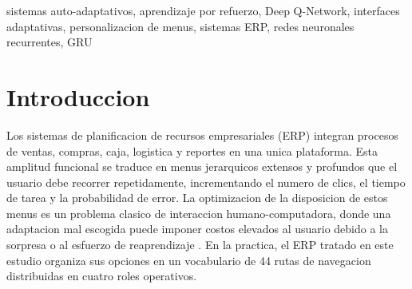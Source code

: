 \documentclass[conference]{IEEEtran}
\begin{document}
\begin{abstract}
Los sistemas ERP concentran gran parte de sus funciones en menus jerarquicos profundos, lo que incrementa el costo de navegacion del usuario y su carga cognitiva. Este trabajo presenta un enfoque auto-adaptativo que personaliza los menus de un ERP de gestion de articulos combinando un modelo neuronal secuencial de prediccion de la siguiente ruta con un agente de aprendizaje por refuerzo profundo del tipo Deep Q-Network (DQN) que reestructura el orden de los items. A partir de un corpus real de 87465 eventos de interaccion agrupados en 1206 sesiones de ocho usuarios y cuatro roles, se compararon cuatro arquitecturas predictivas (LSTM, GRU, Transformer y CNN 1D). La red GRU obtuvo la mejor exactitud sobre el vocabulario completo de 44 rutas (Top-1 de 0.3838 y Top-3 de 0.7294) con la convergencia mas rapida, por lo que fue seleccionada como generadora del puntaje de relevancia que alimenta al agente DQN. La probabilidad predictiva de la GRU se integro con la senal de recompensa del DQN mediante un puntaje compuesto ponderado. En una validacion PRE/POST, el numero de clics (M1) se redujo un 19.09\% (p menor que 0.001; d de Cohen igual a 0.646) y la tasa de error (M3) un 28.94\% (p menor que 0.001; d igual a 0.713), ambos con efecto medio y estadisticamente significativos; el tiempo de tarea (M2) disminuyo un 28.95\% pero sin significancia estadistica (p igual a 1.0; d igual a 0.284). Los resultados sugieren que la integracion de prediccion secuencial y reestructuracion por refuerzo reduce de forma medible el esfuerzo de navegacion, aunque no alcanza la meta autoimpuesta del 30\% de reduccion de clics.
\end{abstract}

\begin{IEEEkeywords}
sistemas auto-adaptativos, aprendizaje por refuerzo, Deep Q-Network, interfaces adaptativas, personalizacion de menus, sistemas ERP, redes neuronales recurrentes, GRU
\end{IEEEkeywords}

\section{Introduccion}
Los sistemas de planificacion de recursos empresariales (ERP) integran procesos de ventas, compras, caja, logistica y reportes en una unica plataforma. Esta amplitud funcional se traduce en menus jerarquicos extensos y profundos que el usuario debe recorrer repetidamente, incrementando el numero de clics, el tiempo de tarea y la probabilidad de error. La optimizacion de la disposicion de estos menus es un problema clasico de interaccion humano-computadora, donde una adaptacion mal escogida puede imponer costos elevados al usuario debido a la sorpresa o al esfuerzo de reaprendizaje \cite{b_todi}. En la practica, el ERP tratado en este estudio organiza sus opciones en un vocabulario de 44 rutas de navegacion distribuidas en cuatro roles operativos.
\end{document}

